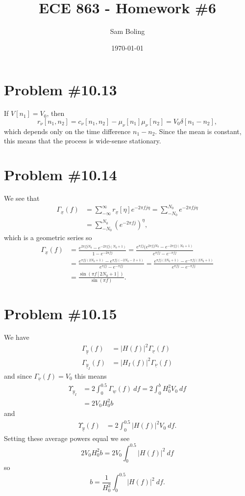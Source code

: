 \documentclass{article}
\title{ECE 863 - Homework \#6}
\author{Sam Boling}
\date{\today}
\begin{document}
\maketitle

\section*{Problem \#10.13}
If $V[n_1] = V_0$, then
$$
r_{\nu}[n_1, n_2] = c_{\nu}[n_1,n_2] - \mu_{\nu}[n_1]\mu_{\nu}[n_2] = V_0 \delta[n_1 - n_2], 
$$
which depends only on the time difference $n_1-n_2$. Since the mean is constant, this means that the process is wide-sense stationary.

\section*{Problem \#10.14}
We see that
\begin{align*}
\Gamma_{\underline{x}}(f) &= \sum_{-\infty}^{\infty}r_{\underline{x}}[\eta] e^{-2\pi f j \eta} 
                           = \sum_{-N_0}^{N_0}e^{-2 \pi f j \eta} \\
                          &= \sum_{-N_0}^{N_0}(e^{-2\pi f j})^{\eta},
\end{align*}
which is a geometric series so
\begin{align*}
\Gamma_{\underline{x}}(f) &= \frac{e^{2 \pi f j N_0} - e^{-2 \pi f j (N_0 + 1)}}{1 - e^{- 2 \pi f j}}
                           = \frac{e^{\pi f j}(e^{2 \pi f j N_0} - e^{-2 \pi f j (N_0 + 1)}}{e^{\pi f j} - e^{-\pi f j}} \\
                          &= \frac{e^{\pi f j(2 N_0 + 1)} - e^{\pi f j(-2 N_0 - 2 + 1)}}{e^{\pi f j} - e^{-\pi f j}} 
                           = \frac{e^{\pi f j(2 N_0 + 1)} - e^{-\pi f j(2N_0 + 1)}}{e^{\pi f j} - e^{- \pi f j}} \\
                          &= \frac{\sin (\pi f [2 N_0 + 1])}{\sin (\pi f)}.
\end{align*}

\section*{Problem \#10.15}
We have
\begin{align*}
\Gamma_{\underline{y}}(f) &= |H(f)|^2 \Gamma_{\underline{\nu}}(f) \\
\Gamma_{\underline{y}_I}(f) &= |H_I(f)|^2 \Gamma_{\underline{\nu}}(f)
\end{align*}
and since $\Gamma_{\underline{\nu}}(f) = V_0$ this means
\begin{align*}
\Upsilon_{\underline{y}_I} 
  &= 2\int_{0}^{0.5} \Gamma_{\underline{w}}(f) ~df 
   = 2\int_{0}^{b} H_0^2 V_0 ~df \\
  &= 2V_0 H_0^2 b
\end{align*}
and
\begin{align*}
\Upsilon_{\underline{y}}(f)
  &= 2\int_{0}^{0.5} |H(f)|^2 V_0 ~df.
\end{align*}
Setting these average powers equal we see
$$
2V_0 H_0^2 b = 2V_0 \int_{0}^{0.5} |H(f)|^2 ~df
$$
so
$$
b = \frac{1}{H_0^2} \int_{0}^{0.5} |H(f)|^2 ~df.
$$
\end{document}
